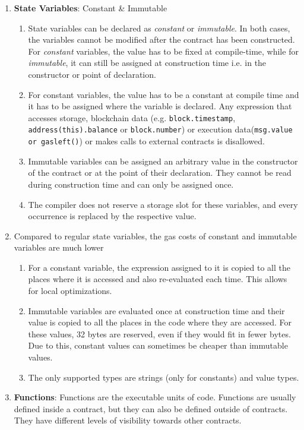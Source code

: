 \begin{enumerate}
\item\textbf{State Variables}: Constant \& Immutable
    \begin{enumerate}
    \item State variables can be declared as \textit{constant} or \textit{immutable}. In both cases, the variables cannot be modified after the contract has been constructed. For \textit{constant} variables, the value has to be fixed at compile-time, while for \textit{immutable}, it can still be assigned at construction time i.e. in the constructor or point of declaration.
    \item For constant variables, the value has to be a constant at compile time and it has to be assigned where the variable is declared. Any expression that accesses storage, blockchain data (e.g. \verb|block.timestamp|, \verb|address(this).balance| or \verb|block.number|) or execution data\linebreak(\verb|msg.value or gasleft()|) or makes calls to external contracts is disallowed.
    \item Immutable variables can be assigned an arbitrary value in the constructor of the contract or at the point of their declaration. They cannot be read during construction time and can only be assigned once.
    \item The compiler does not reserve a storage slot for these variables, and every occurrence is replaced by the respective value.
    \end{enumerate}

\item Compared to regular state variables, the gas costs of constant and immutable variables are much lower
    \begin{enumerate}
    \item For a constant variable, the expression assigned to it is copied to all the places where it is accessed and also re-evaluated each time. This allows for local optimizations.
    \item Immutable variables are evaluated once at construction time and their value is copied to all the places in the code where they are accessed. For these values, 32 bytes are reserved, even if they would fit in fewer bytes. Due to this, constant values can sometimes be cheaper than immutable values.
    \item The only supported types are strings (only for constants) and value types.
    \end{enumerate}

\item\textbf{Functions}: Functions are the executable units of code. Functions are usually defined inside a contract, but they can also be defined outside of contracts. They have different levels of visibility towards other contracts.


\end{enumerate}
